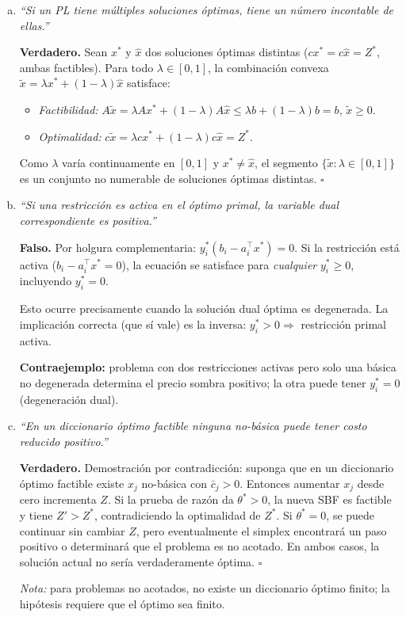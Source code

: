 \documentclass{article}
\begin{document}
\begin{enumerate}[a)]
\textbf{Conclusión:} degeneración de ambos diccionarios no implica $\Delta Z=0$; sí implica $\Delta Z=0$ solo si el pivote es degenerado ($\theta^*=0$).

\item \textit{``Si un PL tiene múltiples soluciones óptimas, tiene un número incontable de ellas.''}

\textbf{Verdadero.} Sean $x^*$ y $\hat{x}$ dos soluciones óptimas distintas ($cx^*=c\hat{x}=Z^*$, ambas factibles). Para todo $\lambda\in[0,1]$, la combinación convexa $\tilde{x}=\lambda x^*+(1-\lambda)\hat{x}$ satisface:
\begin{itemize}
  \item \textit{Factibilidad:} $A\tilde{x}=\lambda Ax^*+(1-\lambda)A\hat{x}\leq\lambda b+(1-\lambda)b=b$, $\tilde{x}\geq0$.
  \item \textit{Optimalidad:} $c\tilde{x}=\lambda cx^*+(1-\lambda)c\hat{x}=Z^*$.
\end{itemize}
Como $\lambda$ varía continuamente en $[0,1]$ y $x^*\neq\hat{x}$, el segmento $\{\tilde{x}:\lambda\in[0,1]\}$ es un conjunto no numerable de soluciones óptimas distintas. $\square$

\item \textit{``Si una restricción es activa en el óptimo primal, la variable dual correspondiente es positiva.''}

\textbf{Falso.} Por holgura complementaria: $y_i^*(b_i-a_i^\top x^*)=0$. Si la restricción está activa ($b_i-a_i^\top x^*=0$), la ecuación se satisface para \emph{cualquier} $y_i^*\geq0$, incluyendo $y_i^*=0$.

Esto ocurre precisamente cuando la solución dual óptima es degenerada. La implicación correcta (que sí vale) es la inversa: $y_i^*>0\Rightarrow$ restricción primal activa.

\textbf{Contraejemplo:} problema con dos restricciones activas pero solo una básica no degenerada determina el precio sombra positivo; la otra puede tener $y_i^*=0$ (degeneración dual).

\item \textit{``En un diccionario óptimo factible ninguna no-básica puede tener costo reducido positivo.''}

\textbf{Verdadero.} Demostración por contradicción: suponga que en un diccionario óptimo factible existe $x_j$ no-básica con $\bar{c}_j>0$. Entonces aumentar $x_j$ desde cero incrementa $Z$. Si la prueba de razón da $\theta^*>0$, la nueva SBF es factible y tiene $Z'>Z^*$, contradiciendo la optimalidad de $Z^*$. Si $\theta^*=0$, se puede continuar sin cambiar $Z$, pero eventualmente el simplex encontrará un paso positivo o determinará que el problema es no acotado. En ambos casos, la solución actual no sería verdaderamente óptima. $\square$

\textit{Nota:} para problemas no acotados, no existe un diccionario óptimo finito; la hipótesis requiere que el óptimo sea finito.

\end{enumerate}
\end{document}

